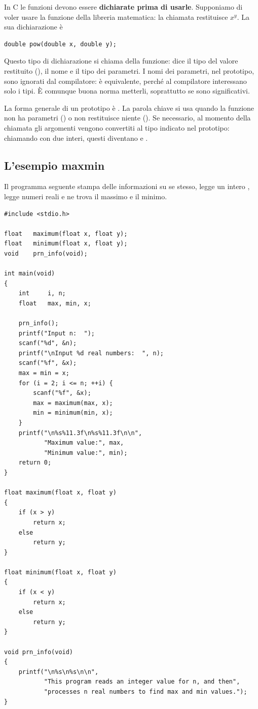 In C le funzioni devono essere \textbf{dichiarate prima di usarle}.
Supponiamo di voler usare la funzione  della libreria matematica:
la chiamata  restituisce $x^y$. La sua dichiarazione è

\begin{lstlisting}[style=c]
double pow(double x, double y);
\end{lstlisting}

Questo tipo di dichiarazione si chiama  della funzione: dice
il tipo del valore restituito (), il nome e il tipo dei
parametri. I nomi dei parametri, nel prototipo, sono ignorati dal
compilatore:  è equivalente, perché al
compilatore interessano solo i tipi. È comunque buona norma metterli,
soprattutto se sono significativi.

La forma generale di un prototipo è
. La parola chiave
 si usa quando la funzione non ha parametri
() o non restituisce niente (). Se
necessario, al momento della chiamata gli argomenti vengono convertiti al
tipo indicato nel prototipo: chiamando  con due interi,
questi diventano  e .

\subsection{L'esempio maxmin}

Il programma seguente stampa delle informazioni su se stesso, legge un intero
, legge  numeri reali e ne trova il massimo e il minimo.

\begin{lstlisting}[style=c, name=maxmin.c]
#include <stdio.h>

float   maximum(float x, float y);
float   minimum(float x, float y);
void    prn_info(void);

int main(void)
{
    int     i, n;
    float   max, min, x;

    prn_info();
    printf("Input n:  ");
    scanf("%d", &n);
    printf("\nInput %d real numbers:  ", n);
    scanf("%f", &x);
    max = min = x;
    for (i = 2; i <= n; ++i) {
        scanf("%f", &x);
        max = maximum(max, x);
        min = minimum(min, x);
    }
    printf("\n%s%11.3f\n%s%11.3f\n\n",
           "Maximum value:", max,
           "Minimum value:", min);
    return 0;
}

float maximum(float x, float y)
{
    if (x > y)
        return x;
    else
        return y;
}

float minimum(float x, float y)
{
    if (x < y)
        return x;
    else
        return y;
}

void prn_info(void)
{
    printf("\n%s\n%s\n\n",
           "This program reads an integer value for n, and then",
           "processes n real numbers to find max and min values.");
}
\end{lstlisting}

